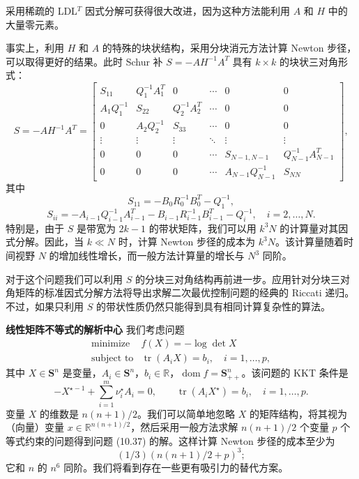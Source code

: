 \documentclass[UTF8,12pt,a4paper,fontset=fandol]{ctexart}
\begin{document}
采用稀疏的 LDL$^T$ 因式分解可获得很大改进，因为这种方法能利用 $A$ 和 $H$ 中的大量零元素。

事实上，利用 $H$ 和 $A$ 的特殊的块状结构，采用分块消元方法计算 Newton 步径，可以取得更好的结果。此时 Schur 补 $S=-AH^{-1}A^T$ 具有 $k\times k$ 的块状三对角形式：
\[
S=-AH^{-1}A^T
=
\begin{bmatrix}
S_{11}&Q_1^{-1}A_1^T&0&\cdots&0&0\\
A_1Q_1^{-1}&S_{22}&Q_2^{-1}A_2^T&\cdots&0&0\\
0&A_2Q_2^{-1}&S_{33}&\cdots&0&0\\
\vdots&\vdots&\vdots&\ddots&\vdots&\vdots\\
0&0&0&\cdots&S_{N-1,N-1}&Q_{N-1}^{-1}A_{N-1}^T\\
0&0&0&\cdots&A_{N-1}Q_{N-1}^{-1}&S_{NN}
\end{bmatrix},
\]
其中
\[
S_{11}=-B_0R_0^{-1}B_0^T-Q_1^{-1},
\]
\[
S_{ii}=-A_{i-1}Q_{i-1}^{-1}A_{i-1}^T-B_{i-1}R_{i-1}^{-1}B_{i-1}^T-Q_i^{-1},\quad i=2,\ldots,N.
\]
特别是，由于 $S$ 是带宽为 $2k-1$ 的带状矩阵，我们可以用 $k^3N$ 的计算量对其因式分解。因此，当 $k\ll N$ 时，计算 Newton 步径的成本为 $k^3N$。该计算量随着时间视野 $N$ 的增加线性增长，而一般方法计算量的增长与 $N^3$ 同阶。

对于这个问题我们可以利用 $S$ 的分块三对角结构再前进一步。应用针对分块三对角矩阵的标准因式分解方法将导出求解二次最优控制问题的经典的 Riccati 递归。不过，如果只利用 $S$ 的带状性质仍然只能得到具有相同计算复杂性的算法。

\noindent\textbf{线性矩阵不等式的解析中心}\quad
我们考虑问题
\begin{equation}
\begin{array}{ll}
\mbox{minimize} & f(X)=-\log\det X\\
\mbox{subject to} & \operatorname{tr}(A_iX)=b_i,\quad i=1,\ldots,p,
\end{array}
\tag{10.37}
\end{equation}
其中 $X\in\mathbf{S}^n$ 是变量，$A_i\in\mathbf{S}^n$，$b_i\in\mathbb{R}$，$\operatorname{dom} f=\mathbf{S}_{++}^n$。该问题的 KKT 条件是
\begin{equation}
-X^{\star -1}+\sum_{i=1}^m\nu_i^\star A_i=0,\qquad
\operatorname{tr}(A_iX^\star)=b_i,\quad i=1,\ldots,p.
\tag{10.38}
\end{equation}
变量 $X$ 的维数是 $n(n+1)/2$。我们可以简单地忽略 $X$ 的矩阵结构，将其视为（向量）变量 $x\in\mathbb{R}^{n(n+1)/2}$，然后采用一般方法求解 $n(n+1)/2$ 个变量 $p$ 个等式约束的问题得到问题 (10.37) 的解。这样计算 Newton 步径的成本至少为
\[
(1/3)(n(n+1)/2+p)^3;
\]
它和 $n$ 的 $n^6$ 同阶。我们将看到存在一些更有吸引力的替代方案。
\end{document}
